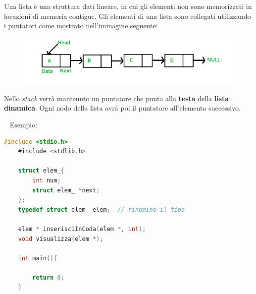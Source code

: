 \documentclass[a4paper,11pt,oneside]{book}
\begin{document}
Una lista è una struttura dati lineare, in cui gli elementi non sono memorizzati in locazioni di memoria contigue. 
Gli elementi di una lista sono collegati utilizzando i puntatori come mostrato nell'immagine seguente:

\begin{figure}[h]
    \includegraphics[scale=0.5]{linkedlist.png}
    \centering
\end{figure}
Nello \emph{stack} verrà mantenuto un puntatore che punta alla \textbf{testa} della \textbf{lista dinamica}.
Ogni nodo della lista avrà poi il puntatore all'elemento successivo.

~\newline
Esempio:
\begin{lstlisting}[language=C]
    #include <stdio.h>
    #include <stdlib.h>

    struct elem_{
        int num;
        struct elem_ *next;
    };
    typedef struct elem_ elem;  // rinomino il tipo

    elem * inserisciInCoda(elem *, int);
    void visualizza(elem *);

    int main(){

        return 0;
    }
\end{lstlisting}
\end{document}
